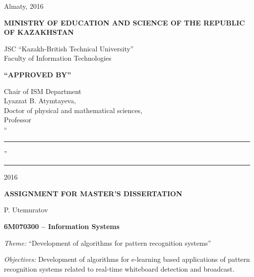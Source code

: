 \begin{titlepage}
\begin{center}
    \end{center}


    \begin{center}
        \vfill
        Almaty, 2016
    \end{center}

    \pagebreak


    \begin{center}
    {\bf{\MakeUppercase{Ministry of education and science of the republic of Kazakhstan}}

        \vspace{14pt}

        JSC ``Kazakh-British Technical University''\\
        Faculty of Information Technologies}

        \vspace{14pt}
        
        \begin{flushright}
            {\bf \MakeUppercase{``Approved by''}}

            Chair of ISM Department\\
            Lyazzat B. Atymtayeva,\\
            Doctor of physical and mathematical sciences,\\
            Professor\\

            \vspace{0.5\baselineskip}
            ``\rule{2em}{0.4pt}'' \rule{8em}{0.4pt} 2016\\
            \end{flushright}
        
        {\bf
        \MakeUppercase{Assignment for master's dissertation}}

    \end{center}

    \setlength{\parindent}{0pt}
    \setlength{\parskip}{1ex plus 0.5ex minus 0.2ex}

    P. Utemuratov

    {\bf 6M070300 -- Information Systems}

    \emph{Theme:} ``Development of algorithms for pattern recognition systems''
    
   \emph{Objectives:}
    Development of algorithms for e-learning based applications of pattern recognition systems related to real-time whiteboard detection and broadcast.
    

\end{titlepage}
